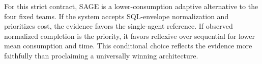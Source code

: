 For this strict contract, SAGE is a lower-consumption adaptive alternative to the
four fixed teams. If the system accepts SQL-envelope normalization and prioritizes
cost, the evidence favors the single-agent reference. If observed normalized
completion is the priority, it favors reflexive over sequential for lower mean
consumption and time. This conditional choice reflects the evidence more faithfully
than proclaiming a universally winning architecture.
